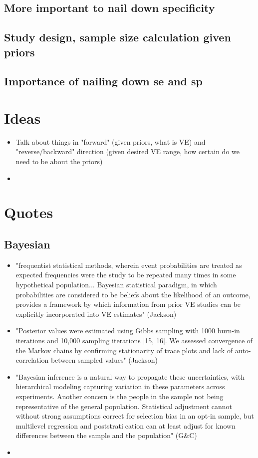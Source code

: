 \documentclass[11pt,notitlepage,twoside]{article}
\begin{document}
\subsection{More important to nail down specificity}

\subsection{Study design, sample size calculation given priors}

\subsection{Importance of nailing down se and sp}

\section{Ideas}
\begin{itemize}
\item Talk about things in "forward" (given priors, what is VE) and "reverse/backward" direction (given desired VE range, how certain do we need to be about the priors)
\item 
\end{itemize}

\section{Quotes}
\subsection{Bayesian}
\begin{itemize}
\item "frequentist statistical
methods, wherein event probabilities are treated as expected frequencies were the study to be repeated many times in some hypothetical population... Bayesian statistical paradigm, in which probabilities are considered to be beliefs about the likelihood of an outcome, provides a framework by which information from prior VE studies can be explicitly incorporated into VE estimates" (Jackson)
\item "Posterior values were estimated using Gibbs sampling with 1000 burn-in iterations and 10,000 sampling iterations [15, 16]. We assessed  convergence of the Markov chains by confirming stationarity of trace plots and lack of auto-correlation between sampled values" (Jackson)
\item "Bayesian inference is a natural way to propagate these uncertainties, with hierarchical modeling capturing variation in these parameters across experiments. Another concern is the people in the sample not being representative of the general population. Statistical adjustment cannot without strong assumptions correct for selection bias in an opt-in sample, but multilevel regression and poststratication can at least adjust for known differences between the sample and the population" (G\&C)
\item 
\end{itemize}
\end{document}
